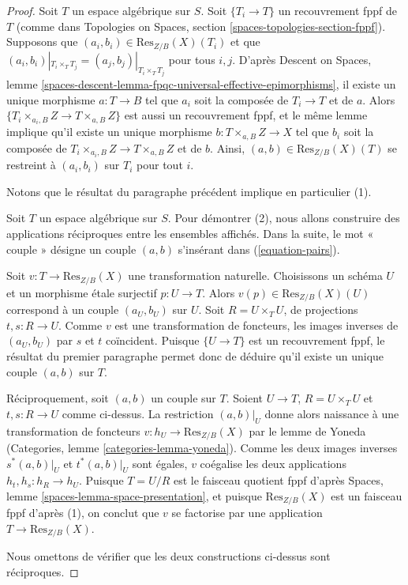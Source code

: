 \begin{proof}
Soit $T$ un espace algébrique sur $S$. Soit $\{T_i \to T\}$ un
recouvrement fppf de $T$ (comme dans
Topologies on Spaces, section \ref{spaces-topologies-section-fppf}).
Supposons que $(a_i, b_i) \in \text{Res}_{Z/B}(X)(T_i)$ et
que $(a_i, b_i)|_{T_i \times_T T_j} = (a_j, b_j)|_{T_i \times_T T_j}$
pour tous $i, j$. D'après
Descent on Spaces,
lemme \ref{spaces-descent-lemma-fpqc-universal-effective-epimorphisms},
il existe un unique morphisme $a : T \to B$ tel que $a_i$ soit la
composée de $T_i \to T$ et de $a$. Alors
$\{T_i \times_{a_i, B} Z \to T \times_{a, B} Z\}$ est aussi un recouvrement
fppf, et le même lemme implique qu'il existe un unique morphisme
$b : T \times_{a, B} Z \to X$ tel que $b_i$ soit la composée
de $T_i \times_{a_i, B} Z \to T \times_{a, B} Z$ et de $b$. Ainsi,
$(a, b) \in \text{Res}_{Z/B}(X)(T)$ se restreint à $(a_i, b_i)$
sur $T_i$ pour tout $i$.

\medskip\noindent
Notons que le résultat du paragraphe précédent implique en particulier (1).

\medskip\noindent
Soit $T$ un espace algébrique sur $S$. Pour démontrer (2), nous allons
construire des applications réciproques entre les ensembles affichés. Dans la
suite, le mot « couple » désigne un couple $(a, b)$ s'insérant
dans (\ref{equation-pairs}).

\medskip\noindent
Soit $v : T \to \text{Res}_{Z/B}(X)$ une transformation naturelle.
Choisissons un schéma $U$ et un morphisme étale surjectif $p : U \to T$.
Alors $v(p) \in \text{Res}_{Z/B}(X)(U)$ correspond à un couple $(a_U, b_U)$
sur $U$. Soit $R = U \times_T U$, de projections $t, s : R \to U$.
Comme $v$ est une transformation de foncteurs, les images inverses de
$(a_U, b_U)$ par $s$ et $t$ coïncident. Puisque $\{U \to T\}$ est un
recouvrement fppf, le résultat du premier paragraphe permet donc de
déduire qu'il existe un unique couple $(a, b)$ sur $T$.

\medskip\noindent
Réciproquement, soit $(a, b)$ un couple sur $T$.
Soient $U \to T$, $R = U \times_T U$ et $t, s : R \to U$ comme
ci-dessus. La restriction $(a, b)|_U$ donne alors naissance à une
transformation de foncteurs $v : h_U \to \text{Res}_{Z/B}(X)$ par le
lemme de Yoneda
(Categories, lemme \ref{categories-lemma-yoneda}).
Comme les deux images inverses $s^*(a, b)|_U$ et $t^*(a, b)|_U$
sont égales, $v$ coégalise les deux applications
$h_t, h_s : h_R \to h_U$. Puisque $T = U/R$ est le faisceau quotient fppf d'après
Spaces, lemme \ref{spaces-lemma-space-presentation},
et puisque $\text{Res}_{Z/B}(X)$ est un faisceau fppf d'après (1), on conclut
que $v$ se factorise par une application $T \to \text{Res}_{Z/B}(X)$.

\medskip\noindent
Nous omettons de vérifier que les deux constructions ci-dessus sont
réciproques.
\end{proof}

